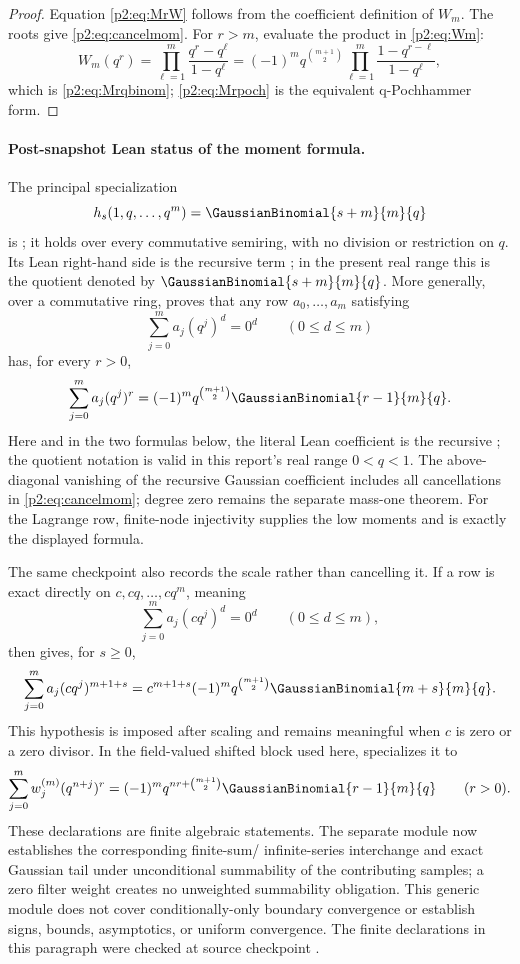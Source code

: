 \documentclass[11pt,oneside]{article}
\numberwithin{equation}{section}
\theoremstyle{definition}
\theoremstyle{remark}
\begin{document}
\begin{proof}
Equation \eqref{p2:eq:MrW} follows from the coefficient definition of \(W_m\).
The roots give \eqref{p2:eq:cancelmom}. For \(r>m\), evaluate the product in
\eqref{p2:eq:Wm}:
\[
 W_m(q^r)=\prod_{\ell=1}^m\frac{q^r-q^\ell}{1-q^\ell}
 =(-1)^m q^{\binom{m+1}{2}}
 \prod_{\ell=1}^m\frac{1-q^{r-\ell}}{1-q^\ell},
\]
which is \eqref{p2:eq:Mrqbinom}; \eqref{p2:eq:Mrpoch} is the equivalent
q-Pochhammer form.
\end{proof}

\paragraph{Post-snapshot Lean status of the moment formula.}
The principal specialization
\[
 h_s(1,q,\ldots,q^m)=\GaussianBinomial{s+m}{m}{q}
\]
is ; it holds over every commutative
semiring, with no division or restriction on \(q\).  Its Lean right-hand side
is the recursive term ; in the present
real range this is the quotient denoted by \(\GaussianBinomial{s+m}{m}{q}\).  More
generally, over a commutative ring,
 proves that any row
\(a_0,\ldots,a_m\) satisfying
\[
 \sum_{j=0}^{m}a_j(q^j)^d=0^d\qquad(0\le d\le m)
\]
has, for every \(r>0\),
\[
 \sum_{j=0}^{m}a_j(q^j)^r
 =(-1)^m q^{\binom{m+1}{2}}\GaussianBinomial{r-1}{m}{q}.
\]
Here and in the two formulas below, the literal Lean coefficient is the
recursive ; the quotient notation is valid in this
report's real range \(0<q<1\).
The above-diagonal vanishing of the recursive Gaussian coefficient includes
all cancellations in \eqref{p2:eq:cancelmom}; degree zero remains the separate
mass-one theorem.  For the Lagrange row, finite-node injectivity supplies the
low moments and  is exactly
the displayed formula.

The same checkpoint also records the scale rather than cancelling it.  If a
row is exact directly on \(c,cq,\ldots,cq^m\), meaning
\[
 \sum_{j=0}^{m}a_j(cq^j)^d=0^d\qquad(0\le d\le m),
\]
then  gives, for \(s\ge0\),
\[
 \sum_{j=0}^{m}a_j(cq^j)^{m+1+s}
 =c^{m+1+s}(-1)^m q^{\binom{m+1}{2}}\GaussianBinomial{m+s}{m}{q}.
\]
This hypothesis is imposed after scaling and remains meaningful when \(c\) is
zero or a zero divisor.  In the field-valued shifted block used here,
 specializes it to
\[
 \sum_{j=0}^{m}w_j^{(m)}(q^{n+j})^r
 =(-1)^m q^{nr+\binom{m+1}{2}}\GaussianBinomial{r-1}{m}{q}
 \qquad(r>0).
\]
These declarations are finite algebraic statements.  The separate module
 now establishes the corresponding finite-sum/
infinite-series interchange and exact Gaussian tail under unconditional
summability of the contributing samples; a zero filter weight creates no
unweighted summability obligation.  This generic module does not cover
conditionally-only boundary convergence or establish signs, bounds,
asymptotics, or uniform convergence.
The finite declarations in this paragraph were checked at source checkpoint
.
\end{document}

